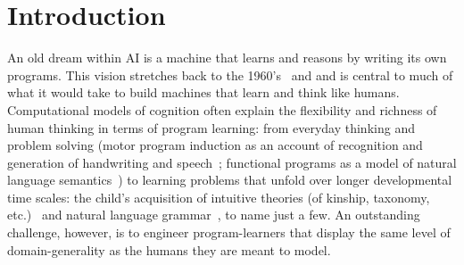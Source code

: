 \documentclass{article}
\begin{document}






\section{Introduction}


An old dream within AI is a machine that learns and reasons by
writing its own programs.  This vision stretches back to the
1960's~\cite{solomonoff1964formal} and and is central to much of
what it would take to build machines that learn and think like humans.
Computational models of cognition often explain the flexibility and
richness of human thinking in terms of program learning: from everyday
thinking and problem solving (motor program induction as an account of
recognition and generation of handwriting and
speech~\cite{lake2015human}; functional programs as a model of natural
language semantics~\cite{SOMETHING}) to learning problems that unfold
over longer developmental time scales: the child's acquisition of
intuitive theories (of kinship, taxonomy, etc.)~\cite{Ullman2012} and
natural language grammar~\cite{DBLP:journals/cogsr/SchmidK11}, to name
just a few.  An outstanding challenge, however, is to engineer
program-learners that display the same level of domain-generality as
the humans they are meant to model.
\end{document}
